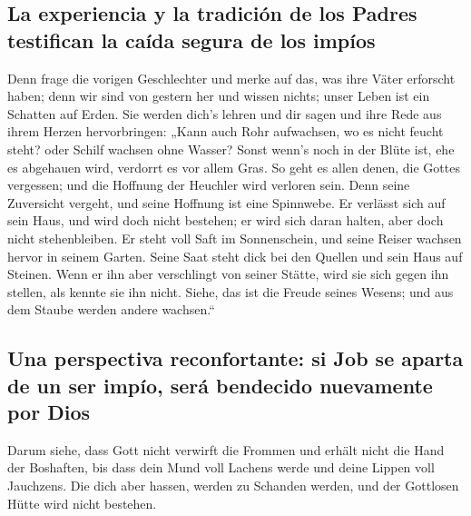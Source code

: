 \hypertarget{la-experiencia-y-la-tradiciuxf3n-de-los-padres-testifican-la-cauxedda-segura-de-los-impuxedos}{%
\subsection{La experiencia y la tradición de los Padres testifican la
caída segura de los
impíos}\label{la-experiencia-y-la-tradiciuxf3n-de-los-padres-testifican-la-cauxedda-segura-de-los-impuxedos}}

 Denn frage die vorigen Geschlechter und merke auf das,
was ihre Väter erforscht haben;  denn wir sind von gestern
her und wissen nichts; unser Leben ist ein Schatten auf Erden.
 Sie werden dich's lehren und dir sagen und ihre Rede aus
ihrem Herzen hervorbringen:  „Kann auch Rohr aufwachsen,
wo es nicht feucht steht? oder Schilf wachsen ohne Wasser?
 Sonst wenn's noch in der Blüte ist, ehe es abgehauen
wird, verdorrt es vor allem Gras.  So geht es allen
denen, die Gottes vergessen; und die Hoffnung der Heuchler wird verloren
sein.  Denn seine Zuversicht vergeht, und seine Hoffnung
ist eine Spinnwebe.  Er verlässt sich auf sein Haus, und
wird doch nicht bestehen; er wird sich daran halten, aber doch nicht
stehenbleiben.  Er steht voll Saft im Sonnenschein, und
seine Reiser wachsen hervor in seinem Garten.  Seine Saat
steht dick bei den Quellen und sein Haus auf Steinen. 
Wenn er ihn aber verschlingt von seiner Stätte, wird sie sich gegen ihn
stellen, als kennte sie ihn nicht.  Siehe, das ist die
Freude seines Wesens; und aus dem Staube werden andere wachsen.``

\hypertarget{una-perspectiva-reconfortante-si-job-se-aparta-de-un-ser-impuxedo-seruxe1-bendecido-nuevamente-por-dios}{%
\subsection{Una perspectiva reconfortante: si Job se aparta de un ser
impío, será bendecido nuevamente por
Dios}\label{una-perspectiva-reconfortante-si-job-se-aparta-de-un-ser-impuxedo-seruxe1-bendecido-nuevamente-por-dios}}

 Darum siehe, dass Gott nicht verwirft die Frommen und
erhält nicht die Hand der Boshaften,  bis dass dein Mund
voll Lachens werde und deine Lippen voll Jauchzens.  Die
dich aber hassen, werden zu Schanden werden, und der Gottlosen Hütte
wird nicht bestehen.

